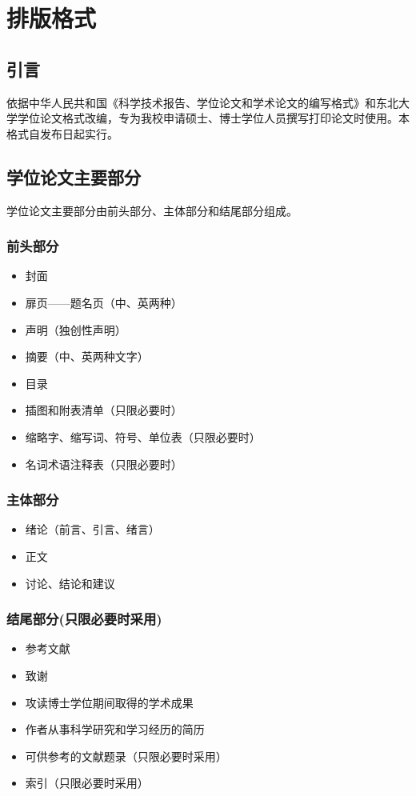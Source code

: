\chapter{排版格式}\label{chap:02}

\section{引言}
依据中华人民共和国《科学技术报告、学位论文和学术论文的编写格式》和东北大学学位论文格式改编，专为我校申请硕士、博士学位人员撰写打印论文时使用。本格式自发布日起实行。
\section{学位论文主要部分}
学位论文主要部分由前头部分、主体部分和结尾部分组成。
\subsection{前头部分}
\begin{itemize}
    \item 封面
    \item 扉页——题名页（中、英两种）
    \item 声明（独创性声明）
    \item 摘要（中、英两种文字）
    \item 目录
    \item 插图和附表清单（只限必要时）
    \item 缩略字、缩写词、符号、单位表（只限必要时）
    \item 名词术语注释表（只限必要时）
\end{itemize}

\subsection{主体部分}
\begin{itemize}
    \item 绪论（前言、引言、绪言）
    \item 正文
    \item 讨论、结论和建议
\end{itemize}
\subsection{结尾部分(只限必要时采用)}
\begin{itemize}
    \item 参考文献
    \item 致谢
    \item 攻读博士学位期间取得的学术成果
    \item 作者从事科学研究和学习经历的简历
    \item 可供参考的文献题录（只限必要时采用）
    \item 索引（只限必要时采用）
\end{itemize}

